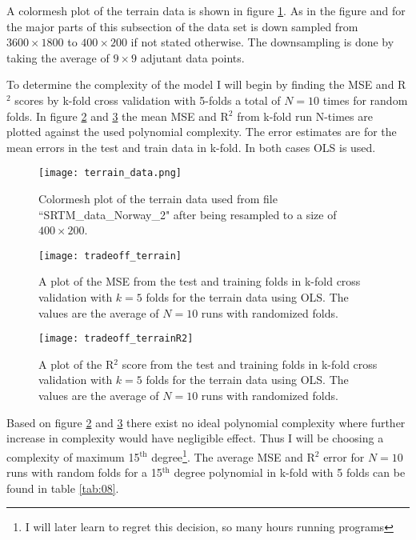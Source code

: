 \documentclass[uio,jmp,amsmath,amssymb,reprint,nofootinbib]{revtex4-1}
\numberwithin{equation}{section}
\begin{document}
A colormesh plot of the terrain data is shown in figure \ref{fig:terrain_data}. As in the figure and for the major parts of this subsection of the data set is down sampled from \(3600\times 1800\) to \(400\times 200\) if not stated otherwise. The downsampling is done by taking the average of \(9\times 9\) adjutant data points.

To determine the complexity of the model I will begin by finding the MSE and R\(^2\) scores by k-fold cross validation with 5-folds a total of \(N=10\) times for random folds. In figure \ref{fig:test_vs_train2} and \ref{fig:test_vs_train3} the mean MSE and R\(^2\) from k-fold run N-times are plotted against the used polynomial complexity. The error estimates are for the mean errors in the test and train data in k-fold. In both cases OLS is used.

\begin{figure}[H]
    \centering
    \texttt{[image: terrain\_data.png]}
    \caption{Colormesh plot of the terrain data used from file ``SRTM\_data\_Norway\_2" after being resampled to a size of \(400\times 200\).}
    \label{fig:terrain_data}
\end{figure}

\begin{figure}[H]
    \centering
    \texttt{[image: tradeoff\_terrain]}
    \caption{A plot of the MSE from the test and training folds in k-fold cross validation with \(k=5\) folds for the terrain data using OLS. The values are the average of \(N=10\) runs with randomized folds.}
    \label{fig:test_vs_train2}
\end{figure}

\begin{figure}[H]
    \centering
    \texttt{[image: tradeoff\_terrainR2]}
    \caption{A plot of the R\(^2\) score from the test and training folds in k-fold cross validation with \(k=5\) folds for the terrain data using OLS. The values are the average of \(N=10\) runs with randomized folds.}
    \label{fig:test_vs_train3}
\end{figure}

Based on figure \ref{fig:test_vs_train2} and \ref{fig:test_vs_train3} there exist no ideal polynomial complexity where further increase in complexity would have negligible effect. Thus I will be choosing a complexity of maximum 15\(^\text{th}\) degree\footnote{I will later learn to regret this decision, so many hours running programs}. The average MSE and R\(^2\) error for \(N=10\) runs with random folds for a 15\(^\text{th}\) degree polynomial in k-fold with 5 folds can be found in table \ref{tab:08}.
\end{document}
